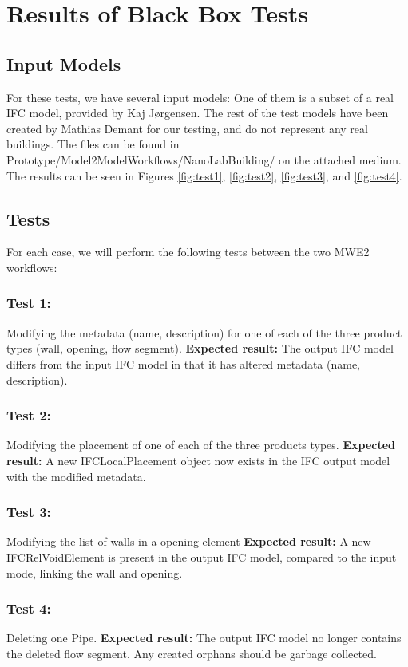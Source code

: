 \newpage
\appendix
\section{Results of Black Box Tests}
\label{app:blackboxtests}
\subsection{Input Models}
For these tests, we have several input models: One of them is a subset of a real IFC model, provided by Kaj Jørgensen. The rest of the test models have been created by Mathias Demant for our testing, and do not represent any real buildings. The files can be found in Prototype/Model2ModelWorkflows/NanoLabBuilding/ on the attached medium. The results can be seen in Figures \ref{fig:test1}, \ref{fig:test2}, \ref{fig:test3}, and \ref{fig:test4}.
\subsection{Tests}
For each case, we will perform the following tests between the two MWE2 workflows:
\subsubsection{Test 1:}
Modifying the metadata (name, description) for one of each of the three product types (wall, opening, flow segment).
\textbf{Expected result:} The output IFC model differs from the input IFC model in that it has altered metadata (name, description).
\subsubsection{Test 2:}
Modifying the placement of one of each of the three products types.
\textbf{Expected result:} A new IFCLocalPlacement object now exists in the IFC output model with the modified metadata. 
\subsubsection{Test 3:}
Modifying the list of walls in a opening element
\textbf{Expected result:} A new IFCRelVoidElement is present in the output IFC model, compared to the input mode, linking the wall and opening.
\subsubsection{Test 4:}
Deleting one Pipe.
\textbf{Expected result:} The output IFC model no longer contains the deleted flow segment. Any created orphans should be garbage collected.
